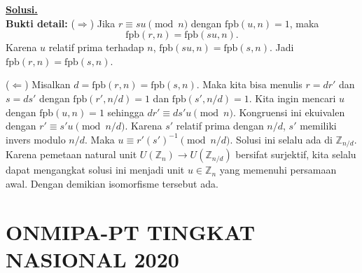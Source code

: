 \documentclass[12pt,twoside]{article}
\newenvironment{solution}
{
	\par\noindent\textbf{\underline{Solusi.}}\\
}
{
	\par
}
\begin{document}
\begin{enumerate}
\begin{solution}
          \textbf{Bukti detail:}
          ($\Rightarrow$) Jika $r \equiv su \pmod n$ dengan $\text{fpb}(u,n)=1$, maka
          \[ \text{fpb}(r, n) = \text{fpb}(su, n). \]
          Karena $u$ relatif prima terhadap $n$, $\text{fpb}(su, n) = \text{fpb}(s, n)$. Jadi $\text{fpb}(r, n) = \text{fpb}(s, n)$.

          ($\Leftarrow$) Misalkan $d = \text{fpb}(r, n) = \text{fpb}(s, n)$.
          Maka kita bisa menulis $r = d r'$ dan $s = d s'$ dengan $\text{fpb}(r', n/d)=1$ dan $\text{fpb}(s', n/d)=1$.
          Kita ingin mencari $u$ dengan $\text{fpb}(u,n)=1$ sehingga $dr' \equiv ds'u \pmod n$.
          Kongruensi ini ekuivalen dengan $r' \equiv s'u \pmod{n/d}$.
          Karena $s'$ relatif prima dengan $n/d$, $s'$ memiliki invers modulo $n/d$.
          Maka $u \equiv r'(s')^{-1} \pmod{n/d}$.
          Solusi ini selalu ada di $\mathbb{Z}_{n/d}$. Karena pemetaan natural unit $U(\mathbb{Z}_n) \to U(\mathbb{Z}_{n/d})$ bersifat surjektif, kita selalu dapat mengangkat solusi ini menjadi unit $u \in \mathbb{Z}_n$ yang memenuhi persamaan awal.
          Dengan demikian isomorfisme tersebut ada.
        \end{solution}
\end{enumerate}

\pagebreak
{}\chead{}
\section{ONMIPA-PT TINGKAT NASIONAL 2020}
\end{document}
